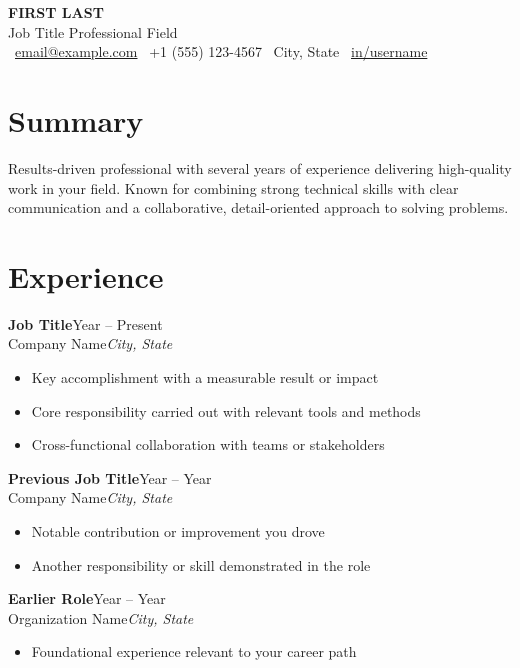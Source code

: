 \documentclass[10pt, letterpaper]{article}
\newcommand{\expentry}[4]{%
    {\bfseries #1}\hfill{\small #3}\\
    {\color{accent}#2}\hfill{\small\itshape #4}\par\vspace{2pt}
}
\begin{document}
{\setlength{\fboxsep}{12pt}%
\noindent\colorbox{accent}{%
\begin{minipage}{\dimexpr\textwidth-2\fboxsep\relax}
    \color{white}
    {\fontsize{26}{30}\bfseries FIRST LAST}\\[3pt]
    {\large Job Title \textbullet{} Professional Field}\\[6pt]
    {\small
    \faEnvelope~\href{mailto:email@example.com}{email@example.com} \quad
    \faPhone~+1 (555) 123-4567 \quad
    \faMapMarker*~City, State \quad
    \faLinkedin~\href{https://linkedin.com/in/username}{in/username}}
\end{minipage}}}

\vspace{6pt}

\section{Summary}
Results-driven professional with several years of experience delivering high-quality work in your field. Known for combining strong technical skills with clear communication and a collaborative, detail-oriented approach to solving problems.

\section{Experience}
\expentry{Job Title}{Company Name}{Year -- Present}{City, State}
\begin{itemize}
    \item Key accomplishment with a measurable result or impact
    \item Core responsibility carried out with relevant tools and methods
    \item Cross-functional collaboration with teams or stakeholders
\end{itemize}
\vspace{5pt}
\expentry{Previous Job Title}{Company Name}{Year -- Year}{City, State}
\begin{itemize}
    \item Notable contribution or improvement you drove
    \item Another responsibility or skill demonstrated in the role
\end{itemize}
\vspace{5pt}
\expentry{Earlier Role}{Organization Name}{Year -- Year}{City, State}
\begin{itemize}
    \item Foundational experience relevant to your career path
\end{itemize}
\end{document}
